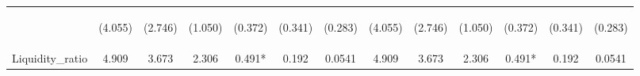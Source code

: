 \documentclass[]{article}
\begin{document}
\begin{center}
\begin{tabular}{lcccccccccccc}
\vspace{4pt} & \begin{footnotesize}(4.055)\end{footnotesize} & \begin{footnotesize}(2.746)\end{footnotesize} & \begin{footnotesize}(1.050)\end{footnotesize} & \begin{footnotesize}(0.372)\end{footnotesize} & \begin{footnotesize}(0.341)\end{footnotesize} & \begin{footnotesize}(0.283)\end{footnotesize} & \begin{footnotesize}(4.055)\end{footnotesize} & \begin{footnotesize}(2.746)\end{footnotesize} & \begin{footnotesize}(1.050)\end{footnotesize} & \begin{footnotesize}(0.372)\end{footnotesize} & \begin{footnotesize}(0.341)\end{footnotesize} & \begin{footnotesize}(0.283)\end{footnotesize} \\
Liquidity\_ratio & 4.909 & 3.673 & 2.306 & 0.491* & 0.192 & 0.0541 & 4.909 & 3.673 & 2.306 & 0.491* & 0.192 & 0.0541 \\

\end{tabular}
\end{center}
\end{document}
